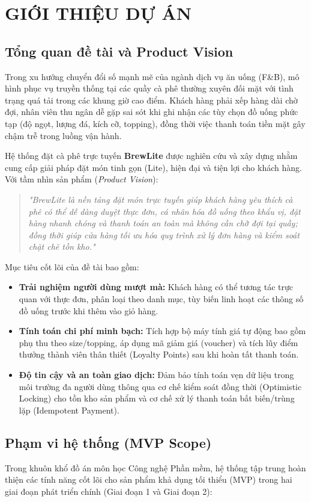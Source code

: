 \chapter{GIỚI THIỆU DỰ ÁN}

\section{Tổng quan đề tài và Product Vision}
Trong xu hướng chuyển đổi số mạnh mẽ của ngành dịch vụ ăn uống (F\&B), mô hình phục vụ truyền thống tại các quầy cà phê thường xuyên đối mặt với tình trạng quá tải trong các khung giờ cao điểm. Khách hàng phải xếp hàng dài chờ đợi, nhân viên thu ngân dễ gặp sai sót khi ghi nhận các tùy chọn đồ uống phức tạp (độ ngọt, lượng đá, kích cỡ, topping), đồng thời việc thanh toán tiền mặt gây chậm trễ trong luồng vận hành.

Hệ thống đặt cà phê trực tuyến \textbf{BrewLite} được nghiên cứu và xây dựng nhằm cung cấp giải pháp đặt món tinh gọn (Lite), hiện đại và tiện lợi cho khách hàng. Với tầm nhìn sản phẩm (\textit{Product Vision}):
\begin{quote}
    \textit{"BrewLite là nền tảng đặt món trực tuyến giúp khách hàng yêu thích cà phê có thể dễ dàng duyệt thực đơn, cá nhân hóa đồ uống theo khẩu vị, đặt hàng nhanh chóng và thanh toán an toàn mà không cần chờ đợi tại quầy; đồng thời giúp cửa hàng tối ưu hóa quy trình xử lý đơn hàng và kiểm soát chặt chẽ tồn kho."}
\end{quote}

Mục tiêu cốt lõi của đề tài bao gồm:
\begin{itemize}
    \item \textbf{Trải nghiệm người dùng mượt mà:} Khách hàng có thể tương tác trực quan với thực đơn, phân loại theo danh mục, tùy biến linh hoạt các thông số đồ uống trước khi thêm vào giỏ hàng.
    \item \textbf{Tính toán chi phí minh bạch:} Tích hợp bộ máy tính giá tự động bao gồm phụ thu theo size/topping, áp dụng mã giảm giá (voucher) và tích lũy điểm thưởng thành viên thân thiết (Loyalty Points) sau khi hoàn tất thanh toán.
    \item \textbf{Độ tin cậy và an toàn giao dịch:} Đảm bảo tính toán vẹn dữ liệu trong môi trường đa người dùng thông qua cơ chế kiểm soát đồng thời (Optimistic Locking) cho tồn kho sản phẩm và cơ chế xử lý thanh toán bất biến/trùng lặp (Idempotent Payment).
\end{itemize}

\section{Phạm vi hệ thống (MVP Scope)}
Trong khuôn khổ đồ án môn học Công nghệ Phần mềm, hệ thống tập trung hoàn thiện các tính năng cốt lõi cho sản phẩm khả dụng tối thiểu (MVP) trong hai giai đoạn phát triển chính (Giai đoạn 1 và Giai đoạn 2):

